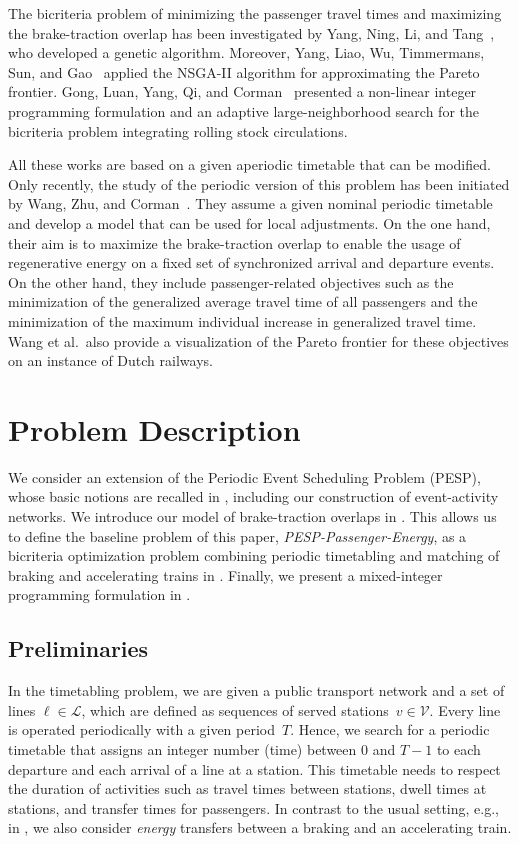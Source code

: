 \documentclass[11pt,a4paper]{article}
\newcommand{\pesppassenergy}{PESP-Passenger-Energy\xspace}
\newcommand{\cL}{\mathcal{L}}
\theoremstyle{definition}
\theoremstyle{remark}
\begin{document}
The bicriteria problem of minimizing the passenger travel times and maximizing the brake-traction overlap has been investigated by Yang, Ning, Li, and Tang~\cite{Yang2014}, who developed a genetic algorithm. Moreover, Yang, Liao, Wu, Timmermans, Sun, and Gao~\cite{Yang2020} applied the NSGA-II algorithm for approximating the Pareto frontier. Gong, Luan, Yang, Qi, and Corman~\cite{gong2024} presented a non-linear integer programming formulation and an adaptive large-neighborhood search for the bicriteria problem integrating rolling stock circulations. %

All these works are based on a given aperiodic timetable that can be modified. Only recently, the study of the periodic version of this problem has been initiated by Wang, Zhu, and Corman~\cite{Wang2022a}. They assume a given nominal periodic timetable and develop a model that can be used for local adjustments. On the one hand, their aim is to maximize the brake-traction overlap to enable the usage of regenerative energy on a fixed set of synchronized arrival and departure events. On the other hand, they include passenger-related objectives such as the minimization of the generalized average travel time of all passengers and the minimization of the maximum individual increase in generalized  travel time. Wang et al.\ also provide a visualization of the Pareto frontier for these objectives on an instance of Dutch railways.

\section{Problem Description}
\label{sec-prob-descr}

We consider an extension of the Periodic Event Scheduling Problem (PESP), whose basic notions are recalled in , including our construction of event-activity networks. We introduce our model of brake-traction overlaps in . This allows us to define the baseline problem of this paper, \emph{\pesppassenergy}, as a bicriteria optimization problem combining periodic timetabling and matching of braking and accelerating trains in . Finally, we present a mixed-integer programming formulation in .

\subsection{Preliminaries}
\label{ss:prob-input}

In the timetabling problem, we are given a public transport network and a set of lines $\ell \in \cL$, which are defined as sequences of served stations~$v \in \mathcal V$. Every line is operated periodically with a given period~$T$. Hence, we search for a periodic timetable that assigns an integer number (time) between $0$ and $T-1$ to each departure and each arrival of a line at a station. This timetable needs to respect the duration of activities such as travel times between stations, dwell times at stations, and transfer times for passengers. In contrast to the usual setting, e.g., in \cite{Liebchen2006}, we also consider \emph{energy} transfers between a braking and an accelerating train.
\end{document}
